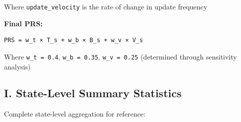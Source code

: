 \documentclass[11pt, a4paper]{article}
\begin{document}
Where \texttt{update\_velocity} is the rate of change in update frequency


\textbf{Final PRS:}


\begin{lstlisting}
PRS = w_t × T_s + w_b × B_s + w_v × V_s
\end{lstlisting}

Where \texttt{w\_t = 0.4}, \texttt{w\_b = 0.35}, \texttt{w\_v = 0.25} (determined through sensitivity analysis)


\subsection{I. State-Level Summary Statistics}

Complete state-level aggregation for reference:
\end{document}
